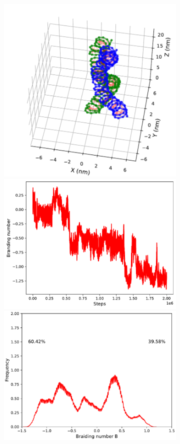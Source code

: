 \documentclass[a4paper,10pt]{article}
\begin{document}
\begin{figure}[tb]
\begin{subfigure}{.3\textwidth}
\includegraphics[width=\textwidth]{brD_150_2000000.pdf}
\includegraphics[width=\textwidth]{brD_150_brand.pdf}
\includegraphics[width=\textwidth]{brD_150_br_pr.pdf}

\end{subfigure}
\end{figure}
\end{document}
